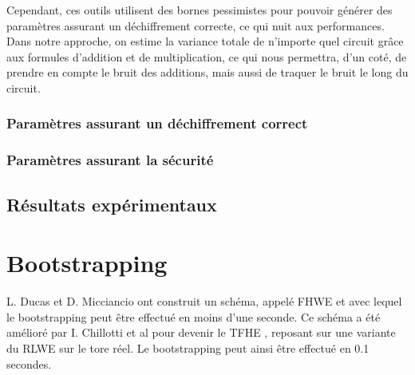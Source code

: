 \documentclass[11pt, headsepline, a4paper, fleqn, oneside]{article}
\begin{document}
Cependant, ces outils utilisent des bornes pessimistes \cite{fan2012somewhat} pour pouvoir générer des paramètres assurant un déchiffrement correcte, ce qui nuit aux performances. Dans notre approche, on estime la variance totale de n'importe quel circuit grâce aux formules d'addition et de multiplication, ce qui nous permettra, d'un coté, de prendre en compte le bruit des additions, mais aussi de traquer le bruit le long du circuit.

\subsubsection{Paramètres assurant un déchiffrement correct}

\subsubsection{Paramètres assurant la sécurité}
\subsection{Résultats expérimentaux}



\section{Bootstrapping}
L. Ducas et D. Micciancio \cite{cryptoeprint:2014:816} ont construit un schéma, appelé FHWE et avec lequel le bootstrapping peut être effectué en moins d'une seconde. Ce schéma a été amélioré par I. Chillotti et al pour devenir le TFHE \cite{TFHE}, reposant sur une variante du RLWE sur le tore réel. Le bootstrapping peut ainsi être effectué en 0.1 secondes.

\newpage
\footnotesize
\nocite{*}    


\end{document}
